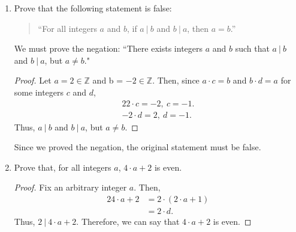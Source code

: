 \documentclass{article}
\begin{document}
\begin{enumerate}
	\item Prove that the following statement is false:
        \begin{quotation}
    	``For all integers $a$ and $b$, if $a \ |\ b$ and $b \ |\ a$, then $a = b$.''
        \end{quotation}
            We must prove the negation: ``There exists integers $a$ and $b$ such that $a \ |\  b$ and $b\ |\  a$, but $a \ne b$."
            \begin{proof}
                Let $a = 2\in \mathbb{Z}$ and b = $\minus 2\in \mathbb{Z}$. Then, since $a \cdot c = b$ and $b \cdot d = a$ for some integers $c$ and $d$, \begin{alignat*}{2}
                    2 \cdot c = -2, \ c = -1. \\
                    -2 \cdot d = 2, \ d = -1.
                \end{alignat*}
                Thus, $a \ |\  b$ and $b\ |\  a$, but $a \ne b$.
            \end{proof}
            Since we proved the negation, the original statement must be false.
            
	\item Prove that, for all integers $a$, $4 \cdot a + 2$ is even.
            \begin{proof}
                Fix an arbitrary integer $a$. Then,
                \begin{alignat*}{2}
                    4 \cdot a + 2 &= 2\cdot(2\cdot a + 1) \\
                    &= 2 \cdot d.
                \end{alignat*}
                Thus, $2 \ |\  4 \cdot a + 2$. Therefore, we can say that $4 \cdot a + 2$ is even.
            \end{proof}


\end{enumerate}
\end{document}
